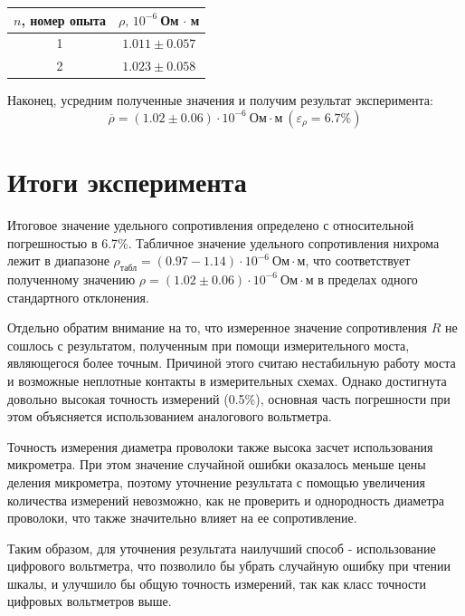 \documentclass[12pt,a4paper]{scrartcl}
\begin{document}
	\begin{center}
		\begin{tabular}{|c|c|}
			\hline $n$, номер опыта & $\rho,\, 10^{-6}\ $Ом$\,\cdot\,$м
			\\\hline 1 & $1.011 \pm 0.057$
			\\\hline 2 & $1.023 \pm 0.058$ 
			\\\hline
		\end{tabular}
	\end{center}
	
	Наконец, усредним полученные значения и получим результат эксперимента:
	$$\overline{\rho} = (1.02 \pm 0.06) \cdot 10^{-6}\ \text{Ом} \cdot \text{м}\ (\varepsilon_\rho = 6.7\%)$$

	\section{Итоги эксперимента}
	Итоговое значение удельного сопротивления определено с относительной погрешностью в 6.7\%. Табличное значение удельного сопротивления нихрома лежит в диапазоне $\rho_{\text{табл}} = (0.97 - 1.14) \cdot 10^{-6}\ \text{Ом} \cdot \text{м}$, что соответствует полученному значению $\rho = (1.02 \pm 0.06) \cdot 10^{-6}\ \text{Ом} \cdot \text{м}$ в пределах одного стандартного отклонения.
	\par Отдельно обратим внимание на то, что измеренное значение сопротивления $R$ не сошлось с результатом, полученным при помощи измерительного моста, являющегося более точным. Причиной этого считаю нестабильную работу моста и возможные неплотные контакты в измерительных схемах. Однако достигнута довольно высокая точность измерений (0.5\%), основная часть погрешности при этом объясняется использованием аналогового вольтметра.
	\par Точность измерения диаметра проволоки также высока засчет использования микрометра. При этом значение случайной ошибки оказалось меньше цены деления микрометра, поэтому уточнение результата с помощью увеличения количества измерений невозможно, как не проверить и однородность диаметра проволоки, что также значительно влияет на ее сопротивление.
	\par Таким образом, для уточнения результата наилучший способ - использование цифрового вольтметра, что позволило бы убрать случайную ошибку при чтении шкалы, и улучшило бы общую точность измерений, так как класс точности цифровых вольтметров выше.
\end{document}
